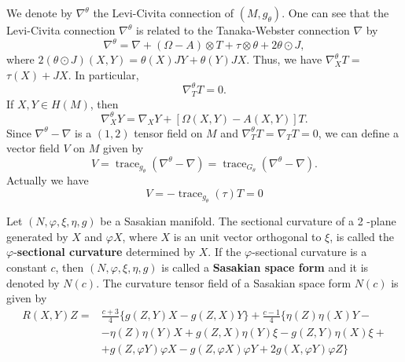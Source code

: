 We denote by $\nabla^\theta$ the Levi-Civita connection of $\left(M, g_\theta\right)$. One can see that the Levi-Civita connection $\nabla^\theta$ is related to the Tanaka-Webster connection $\nabla$ by
\begin{equation}\label{eq33}
    \nabla^\theta=\nabla+(\Omega-A) \otimes T+\tau \otimes \theta+2 \theta \odot J,
\end{equation}
where $2(\theta \odot J)(X, Y)=\theta(X) J Y+\theta(Y) J X$. Thus, we have $\nabla_X^\theta T=$ $\tau(X)+J X$. In particular, 
\begin{equation}
    \nabla_T^\theta T=0.
\end{equation}
If $X, Y \in H(M)$, then
\begin{equation}
    \nabla_X^\theta Y=\nabla_X Y+[\Omega(X, Y)-A(X, Y)] T .
\end{equation}
Since $\nabla^\theta-\nabla$ is a $(1,2)$ tensor field on $M$ and $\nabla_T^\theta T=\nabla_T T=0$, we can define a vector field $V$ on $M$ given by
\begin{equation}
    V=\operatorname{trace}_{g_\theta}\left(\nabla^\theta-\nabla\right)=\operatorname{trace}_{G_\theta}\left(\nabla^\theta-\nabla\right) .
\end{equation}
Actually we have 
\begin{equation}
    V=-\operatorname{trace}_{g_\theta}(\tau) T=0
\end{equation}







\begin{definition}
    Let $(N, \varphi, \xi, \eta, g)$ be a Sasakian manifold. The sectional curvature of a 2 -plane generated by $X$ and $\varphi X$, where $X$ is an unit vector orthogonal to $\xi$, is called the $\varphi$-\textbf{sectional curvature} determined by $X$. If the $\varphi$-sectional curvature is a constant $c$, then $(N, \varphi, \xi, \eta, g)$ is called a \textbf{Sasakian space form} and it is denoted by $N(c)$.
The curvature tensor field of a Sasakian space form $N(c)$ is given by
\begin{equation}
    \begin{aligned}
R(X, Y) Z= & \frac{c+3}{4}\{g(Z, Y) X-g(Z, X) Y\}+\frac{c-1}{4}\{\eta(Z) \eta(X) Y- \\
& -\eta(Z) \eta(Y) X+g(Z, X) \eta(Y) \xi-g(Z, Y) \eta(X) \xi+ \\
& +g(Z, \varphi Y) \varphi X-g(Z, \varphi X) \varphi Y+2 g(X, \varphi Y) \varphi Z\}
\end{aligned}
\end{equation}
\end{definition}

